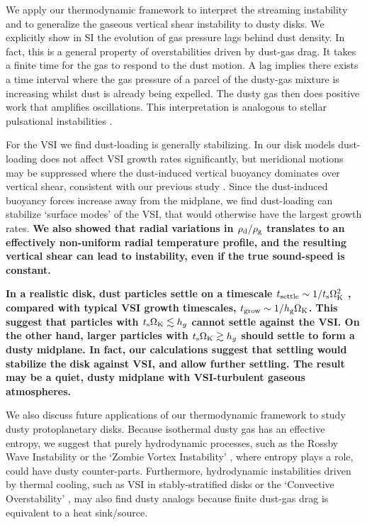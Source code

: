 

We  apply our thermodynamic framework to interpret
the streaming instability \citep[SI, ][]{youdin05a,jacquet11} and to generalize the gaseous vertical shear
instability \citep[VSI, ][]{nelson13,lin15} to dusty disks. We 
explicitly show in SI the evolution of gas 
pressure lags behind dust density. In fact, this is a general property of 
overstabilities driven by dust-gas drag. 
It takes a finite time for the gas to respond to
the dust motion. A lag implies there exists a time interval where 
the gas pressure of a parcel of the dusty-gas mixture is increasing whilst dust is already being expelled.  
The dusty gas then does positive work that amplifies 
oscillations. This interpretation is analogous to stellar pulsational
instabilities \citep{cox67}. 

For the VSI we find dust-loading is generally stabilizing. In our disk models 
dust-loading does not affect VSI growth rates significantly, but
meridional motions may be suppressed where the dust-induced
vertical buoyancy dominates over vertical shear, consistent with our
previous study \citep{lin15}. 
Since the dust-induced buoyancy forces
increase away from the midplane, we find dust-loading can stabilize
`surface modes'  of the VSI, that would otherwise have the largest
growth rates. {\bf We also showed that radial variations in
  $\rho_\mathrm{d}/\rho_\mathrm{g}$ translates to an effectively non-uniform radial temperature
  profile, and the resulting vertical shear can lead to instability,
  even if the true sound-speed is constant. 
}  

{\bf In a realistic disk, dust particles settle on a timescale $
  t_\mathrm{settle} \sim 1/t_\mathrm{s}\Omega_{\rm K}^2$ \citep{takeuchi02}, compared 
  with typical VSI growth timescales, $t_\mathrm{grow}\sim 
  1/h_\mathrm{g}\Omega_{\rm K}$. This suggest that particles with $t_\mathrm{s}\Omega_{\rm K}\lesssim 
  h_g$ cannot settle against the VSI. On the 
  other hand, larger particles with $t_\mathrm{s}\Omega_{\rm K}\gtrsim h_g$ should
  settle to form a dusty midplane. In fact, our calculations suggest that
  settling would stabilize the disk against VSI, and allow
  further settling. The result may be a quiet, dusty midplane \citep[unless non-axisymmetric
  instabilities develop][]{chiang08} with VSI-turbulent gaseous
  atmospheres. 
}


We also discuss future applications of our thermodynamic framework to 
study dusty protoplanetary disks. Because isothermal dusty gas has an
effective entropy, we suggest that purely hydrodynamic processes, such
as the Rossby Wave Instability \citep{li00} or the `Zombie Vortex
Instability' \citep{marcus15}, where entropy plays a role, could have dusty counter-parts.   
Furthermore, hydrodynamic instabilities driven by thermal cooling, such as VSI in
stably-stratified disks \citep{lin15} or the `Convective
Overstability' \citep{klahr14, lyra14},  may also find dusty analogs 
because finite dust-gas drag is equivalent to a heat sink/source. 


